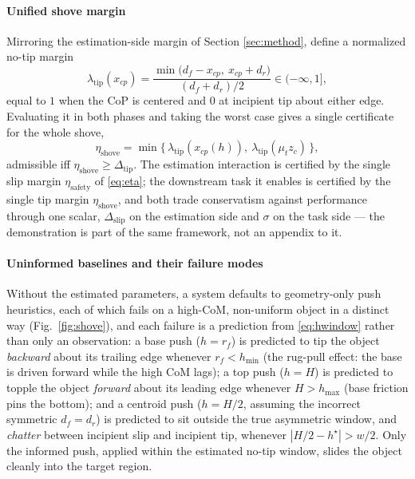 \documentclass[10pt, conference]{IEEEtran}
\begin{document}
\paragraph{Unified shove margin}
Mirroring the estimation-side margin of Section \ref{sec:method}, define a normalized no-tip margin
\begin{equation}
    \lambda_{\mathrm{tip}}(x_{cp}) = \frac{\min\big(d_f - x_{cp},\ x_{cp}+d_r\big)}{(d_f+d_r)/2} \in (-\infty,1], \label{eq:lambda_tip}
\end{equation}
equal to $1$ when the CoP is centered and $0$ at incipient tip about either edge. Evaluating it in both phases and taking the worst case gives a single certificate for the whole shove,
\begin{equation}
    \eta_{\mathrm{shove}} = \min\big\{\, \lambda_{\mathrm{tip}}(x_{cp}(h)),\ \lambda_{\mathrm{tip}}(\mu_t z_c) \,\big\}, \label{eq:eta_shove}
\end{equation}
admissible iff $\eta_{\mathrm{shove}} \ge \Delta_{\mathrm{tip}}$. The estimation interaction is certified by the single slip margin $\eta_{\mathrm{safety}}$ of \eqref{eq:eta}; the downstream task it enables is certified by the single tip margin $\eta_{\mathrm{shove}}$, and both trade conservatism against performance through one scalar, $\Delta_{\mathrm{slip}}$ on the estimation side and $\sigma$ on the task side --- the demonstration is part of the same framework, not an appendix to it.

\paragraph{Uninformed baselines and their failure modes}
Without the estimated parameters, a system defaults to geometry-only push heuristics, each of which fails on a high-CoM, non-uniform object in a distinct way (Fig.~\ref{fig:shove}), and each failure is a prediction from \eqref{eq:hwindow} rather than only an observation: a base push ($h=r_f$) is predicted to tip the object \emph{backward} about its trailing edge whenever $r_f < h_{\min}$ (the rug-pull effect: the base is driven forward while the high CoM lags); a top push ($h=H$) is predicted to topple the object \emph{forward} about its leading edge whenever $H > h_{\max}$ (base friction pins the bottom); and a centroid push ($h=H/2$, assuming the incorrect symmetric $d_f=d_r$) is predicted to sit outside the true asymmetric window, and \emph{chatter} between incipient slip and incipient tip, whenever $|H/2-h^{\star}|>w/2$. Only the informed push, applied within the estimated no-tip window, slides the object cleanly into the target region.
\end{document}
